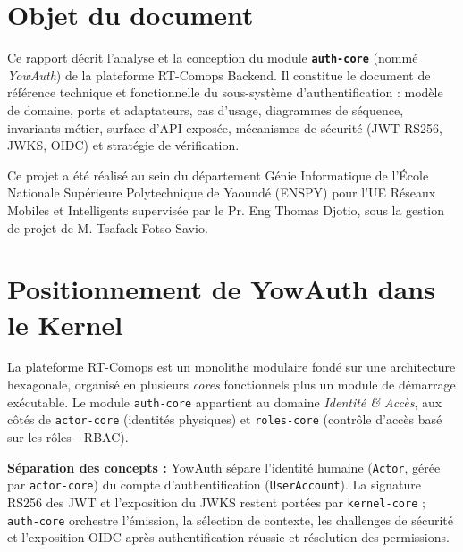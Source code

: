 \documentclass[11pt,a4paper,oneside]{report}
\newcommand{\code}[1]{\texttt{\small #1}}
\begin{document}
\section{Objet du document}
Ce rapport décrit l'analyse et la conception du module \textbf{\code{auth-core}} (nommé \emph{YowAuth}) de la plateforme RT-Comops Backend. Il constitue le document de référence technique et fonctionnelle du sous-système d'authentification : modèle de domaine, ports et adaptateurs, cas d'usage, diagrammes de séquence, invariants métier, surface d'API exposée, mécanismes de sécurité (JWT RS256, JWKS, OIDC) et stratégie de vérification.

Ce projet a été réalisé au sein du département Génie Informatique de l'École Nationale Supérieure Polytechnique de Yaoundé (ENSPY) pour l'UE Réseaux Mobiles et Intelligents supervisée par le Pr. Eng Thomas Djotio, sous la gestion de projet de M. Tsafack Fotso Savio.

\section{Positionnement de YowAuth dans le Kernel}
La plateforme RT-Comops est un monolithe modulaire fondé sur une architecture hexagonale, organisé en plusieurs \emph{cores} fonctionnels plus un module de démarrage exécutable. Le module \code{auth-core} appartient au domaine \emph{Identité \& Accès}, aux côtés de \code{actor-core} (identités physiques) et \code{roles-core} (contrôle d'accès basé sur les rôles - RBAC).

\begin{rolebox}
\textbf{Séparation des concepts :} YowAuth sépare l'identité humaine (\code{Actor}, gérée par \code{actor-core}) du compte d'authentification (\code{UserAccount}). La signature RS256 des JWT et l'exposition du JWKS restent portées par \code{kernel-core} ; \code{auth-core} orchestre l'émission, la sélection de contexte, les challenges de sécurité et l'exposition OIDC après authentification réussie et résolution des permissions.
\end{rolebox}
\end{document}
